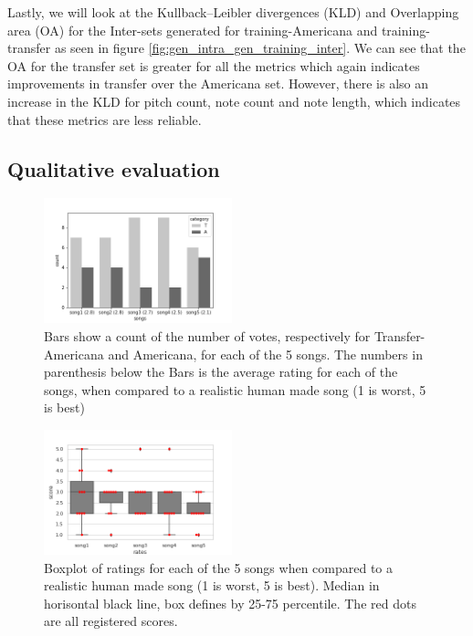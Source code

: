 \documentclass{IEEEtran}
\begin{document}
Lastly, we will look at the Kullback–Leibler divergences (KLD) and
Overlapping area (OA) for the Inter-sets generated for training-Americana and
training-transfer as seen in figure \ref{fig:gen_intra_gen_training_inter}.
We can see that the OA for the transfer set is greater for all the metrics
which again indicates improvements in transfer over the Americana set.
However, there is also an increase in the KLD for pitch count, note count and
note length, which indicates that these metrics are less reliable.

\subsection{Qualitative evaluation}

\begin{figure}
    \centering
    \includegraphics[width=0.485\textwidth]{songs_category.png}
    \caption{
        Bars show a count of the number of votes, respectively for
        Transfer-Americana and Americana, for each of the 5 songs.
        The numbers in parenthesis below the Bars is the average rating
        for each of the songs, when compared to a realistic human made
        song (1 is worst, 5 is best)
    \label{fig:songs}
    } 
\end{figure}

\begin{figure}
    \centering
    \includegraphics[width=0.485\textwidth]{scores.png}
    \caption{
        Boxplot of ratings for each of the 5 songs when compared to a realistic
        human made song (1 is worst, 5 is best). Median in horisontal black line,
        box defines by 25-75 percentile. The red dots are all registered scores.
        \label{fig:scores}
    }
\end{figure}
\end{document}
